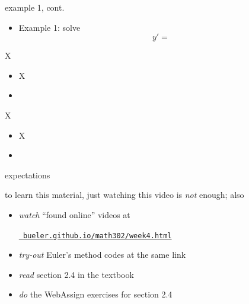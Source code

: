 \documentclass{beamer}
\begin{document}
\begin{frame}{example 1, cont.}

\begin{itemize}
\item Example 1: solve
    $$y' = $$
\end{itemize}
\end{frame}

\begin{frame}{X}

\begin{itemize}
\item X
\item 
\end{itemize}
\end{frame}

\begin{frame}{X}

\begin{itemize}
\item X
\item 
\end{itemize}
\end{frame}

\begin{frame}{expectations}

to learn this material, just watching this video is \emph{not} enough; also
\begin{itemize}
\item \emph{watch} ``found online'' videos at

\centerline{\href{https://bueler.github.io/math302/week4.html}{\tt \color{cyan} bueler.github.io/math302/week4.html}}
\item \emph{try-out} Euler's method codes at the same link
\item \emph{read} section 2.4 in the textbook
\item \emph{do} the WebAssign exercises for section 2.4
\end{itemize}
\end{frame}
\end{document}

